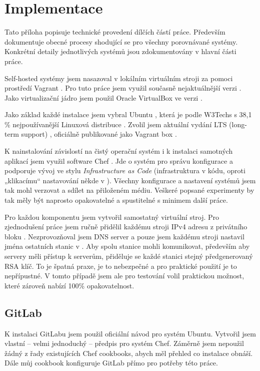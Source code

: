 \chapter{Implementace}\label{ch:implementace}

Tato příloha popisuje technické provedení dílčích částí práce. Především dokumentuje obecné procesy shodující se pro všechny porovnávané \CICD systémy. Konkrétní detaily jednotlivých systémů jsou zdokumentovány v hlavní části práce.

Self-hosted \CICD systémy jsem nasazoval v lokálním virtuálním stroji za pomoci prostředí Vagrant \cite{hashimoto-vagrant}\cite{susanka-vagrant}. Pro tuto práce jsem využil současně nejaktuálnější verzi . Jako virtualizační jádro jsem použil Oracle VirtualBox \cite{virtualbox} ve verzi .

Jako základ každé instalace jsem vybral Ubuntu \cite{ubuntu}, která je podle W3Techs s 38,1 \% nejpoužívanější Linuxová distribuce \cite{w3techs-stats}. Zvolil jsem aktuální vydání LTS (long-term support) , oficiálně publikované jako Vagrant box .

K nainstalování závislostí na čistý operační systém i k instalaci samotných aplikací jsem využil software Chef \cite{chef}. Jde o systém pro správu konfigurace a podporuje vývoj ve stylu \textit{Infrastructure as Code} (infrastruktura v kódu, oproti „klikacímu“ nastavování někde v ). Všechny konfigurace a nastavení systémů jsem tak mohl verzovat a sdílet na přiloženém médiu. Veškeré popsané experimenty by tak měly být naprosto opakovatelné a spustitelné s minimem další práce.

Pro každou komponentu jsem vytvořil samostatný virtuální stroj. Pro zjednodušení práce jsem ručně přidělil každému stroji IPv4 adresu z privátního bloku . Nezprovozňoval jsem DNS server a pouze jsem každému stroji nastavil jména ostatních stanic v . Aby spolu stanice mohli komunikovat, především aby \CD servery měli přístup k \HTTP serverům, přiděluje se každé stanici stejný předgenerovaný RSA klíč. To je špatná praxe, je to nebezpečné a pro praktické použití je to nepřípustné. V tomto případě jsem ale pro testování volil praktickou možnost, které zároveň nabízí 100\% opakovatelnost.

\section{GitLab}
    K instalaci GitLabu jsem použil oficiální návod pro systém Ubuntu. Vytvořil jsem vlastní -- velmi jednoduchý -- předpis pro systém Chef. Záměrně jsem nepoužil žádný z řady existujících Chef cookbooks, abych měl přehled co instalace obnáší. Dále můj cookbook konfiguruje GitLab přímo pro potřeby této práce.

